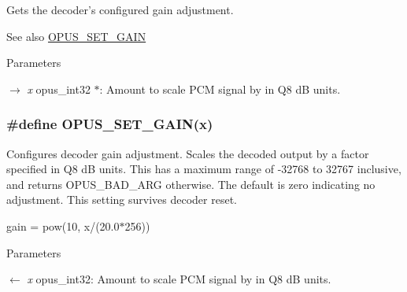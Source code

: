 Gets the decoder's configured gain adjustment. \begin{DoxySeeAlso}{See also}
\hyperlink{group__opus__decoderctls_ga8ddb6fa694efa2c7e95ef51addc70dac}{OPUS\_\-SET\_\-GAIN}
\end{DoxySeeAlso}

\begin{DoxyParams}{Parameters}
\item[\mbox{$\rightarrow$} {\em x}]{\ttfamily opus\_\-int32 $\ast$}: Amount to scale PCM signal by in Q8 dB units. \end{DoxyParams}
\hypertarget{group__opus__decoderctls_ga8ddb6fa694efa2c7e95ef51addc70dac}{
\subsubsection[{OPUS\_\-SET\_\-GAIN}]{\setlength{\rightskip}{0pt plus 5cm}\#define OPUS\_\-SET\_\-GAIN(x)}}
\label{group__opus__decoderctls_ga8ddb6fa694efa2c7e95ef51addc70dac}


Configures decoder gain adjustment. Scales the decoded output by a factor specified in Q8 dB units. This has a maximum range of -\/32768 to 32767 inclusive, and returns OPUS\_\-BAD\_\-ARG otherwise. The default is zero indicating no adjustment. This setting survives decoder reset.

gain = pow(10, x/(20.0$\ast$256))


\begin{DoxyParams}{Parameters}
\item[\mbox{$\leftarrow$} {\em x}]{\ttfamily opus\_\-int32}: Amount to scale PCM signal by in Q8 dB units. \end{DoxyParams}
